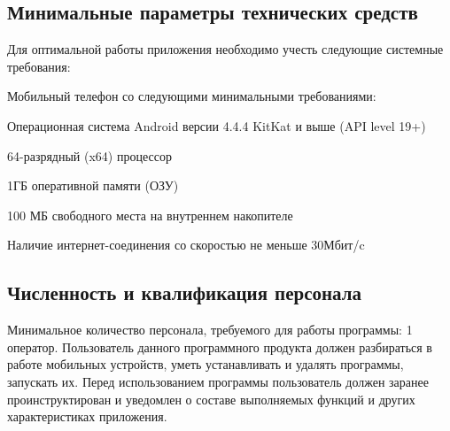 \subsection{Минимальные параметры технических средств}
Для оптимальной работы приложения необходимо учесть следующие системные требования:
\begin{my_enumerate}
    \item Мобильный телефон со следующими минимальными требованиями:
    \begin{my_enumerate}
        \item Операционная система Android версии 4.4.4 KitKat и выше (API level 19+)
        \item 64-разрядный (x64) процессор
        \item 1ГБ оперативной памяти (ОЗУ)
        \item 100 МБ свободного места на внутреннем накопителе
    \end{my_enumerate}
    \item Наличие интернет-соединения со скоростью не меньше 30Мбит/c
\end{my_enumerate}


\subsection{Численность и квалификация персонала}
Минимальное количество персонала, требуемого для работы программы: 1 оператор.
Пользователь данного программного продукта должен разбираться в работе
мобильных устройств, уметь устанавливать и удалять программы, запускать их.
Перед использованием программы пользователь должен заранее проинструктирован и
уведомлен о составе выполняемых функций и других характеристиках приложения.

